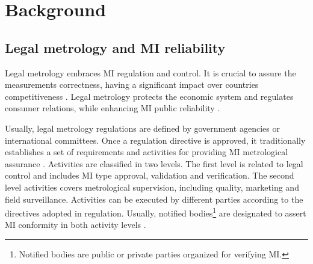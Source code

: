 \documentclass[journal]{IEEEtran} %
\begin{document}

\section{Background}
\subsection{Legal metrology and MI reliability}
\label{s:mi_realiability}
Legal metrology embraces MI regulation and control. It is crucial to assure the measurements correctness, having a significant impact over countries competitiveness \cite{RodriguesFilho2015}. Legal metrology protects the economic system and regulates consumer relations, while enhancing MI public reliability \cite{Oppermann2016}.

Usually, legal metrology regulations are defined by government agencies or international committees. Once a regulation directive is approved, it traditionally establishes a set of requirements and activities for providing MI metrological assurance \cite{RodriguesFilho2015}. Activities are classified in two levels. The first level is related to legal control and includes MI type approval, validation and verification. The second level activities covers metrological supervision, including quality, marketing and field surveillance. Activities can be executed by different parties according to the directives adopted in regulation. Usually, notified bodies\footnote{Notified bodies are public or private parties organized for verifying MI.} are designated to assert MI conformity in both activity levels \cite{Esche2015,Oppermann2016}. 
\end{document}
